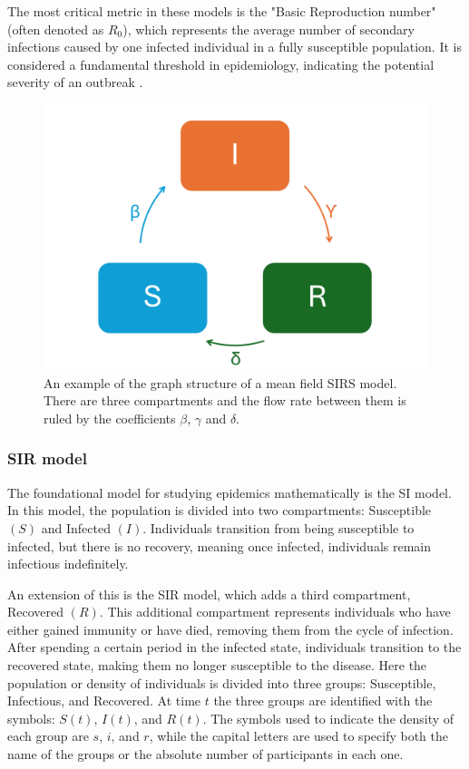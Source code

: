 The most critical metric in these models is the "Basic Reproduction number" (often denoted as $R_0$), which represents the average number of secondary infections caused by one infected individual in a fully susceptible population. It is considered a fundamental threshold in epidemiology, indicating the potential severity of an outbreak \cite{Hernandez_Vargas_2022}. 
\begin{figure}[]
	\centering
	\includegraphics[width=0.65\linewidth]{0_introduction/images_introduction/SIRS_figure_compartmental}
	\caption[SIRS example]{An example of the graph structure of a mean field SIRS model. There are three compartments and the flow rate between them is ruled by the coefficients $\beta$, $\gamma$ and $\delta$.}
	\label{fig:sirsfigurecompartmental}
\end{figure}


\subsubsection{SIR model}
\label{subsec:SIR}
The foundational model for studying epidemics mathematically is the SI model. In this model, the population is divided into two compartments: Susceptible $(S)$ and Infected $(I)$. Individuals transition from being susceptible to infected, but there is no recovery, meaning once infected, individuals remain infectious indefinitely.

An extension of this is the SIR model, which adds a third compartment, Recovered $(R)$. This additional compartment represents individuals who have either gained immunity or have died, removing them from the cycle of infection. After spending a certain period in the infected state, individuals transition to the recovered state, making them no longer susceptible to the disease.
Here the population or density of individuals is divided into three groups: Susceptible, Infectious, and Recovered. At time $t$ the three groups are identified with the symbols: $S(t)$, $I(t)$, and $R(t)$. 
The symbols used to indicate the density of each group are $s$, $i$, and $r$, while the capital letters are used to specify both the name of the groups or the absolute number of participants in each one. 

